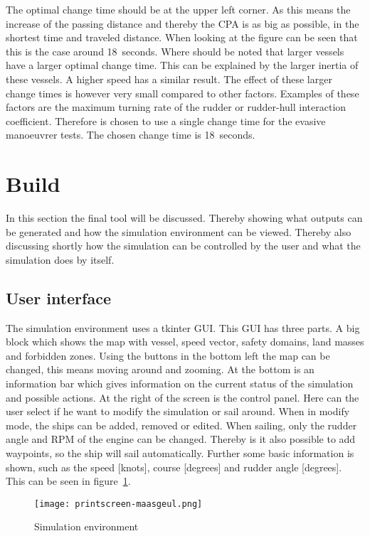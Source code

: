 The optimal change time should be at the upper left corner. As this means the increase of the passing distance and thereby the CPA is as big as possible, in the shortest time and traveled distance. When looking at the figure can be seen that this is the case around 18~seconds. Where should be noted that larger vessels have a larger optimal change time. This can be explained by the larger inertia of these vessels. A higher speed has a similar result. The effect of these larger change times is however very small compared to other factors. Examples of these factors are the maximum  turning rate of the rudder or rudder-hull interaction coefficient. Therefore is chosen to use a single change time for the evasive manoeuvrer tests. The chosen change time is 18~seconds.

\section{Build}
In this section the final tool will be discussed. Thereby showing what outputs can be generated and how the simulation environment can be viewed. Thereby also discussing shortly how the simulation can be controlled by the user and what the simulation does by itself.

\subsection{User interface}
The simulation environment uses a tkinter GUI. This GUI has three parts. A big block which shows the map with vessel, speed vector, safety domains, land masses and forbidden zones. Using the buttons in the bottom left the map can be changed, this means moving around and zooming. At the bottom is an information bar which gives information on the current status of the simulation and possible actions. At the right of the screen is the control panel. Here can the user select if he want to modify the simulation or sail around. When in modify mode, the ships can be added, removed or edited. When sailing, only the rudder angle and RPM of the engine can be changed. Thereby is it also possible to add waypoints, so the ship will sail automatically. Further some basic information is shown, such as the speed [knots], course [degrees] and rudder angle [degrees]. This can be seen in figure~\ref{fig:printscreen-tool2}.

\begin{figure}[p]
	\centering
	\texttt{[image: printscreen-maasgeul.png]}
	\caption{Simulation environment}
	\label{fig:printscreen-tool2}
\end{figure}

